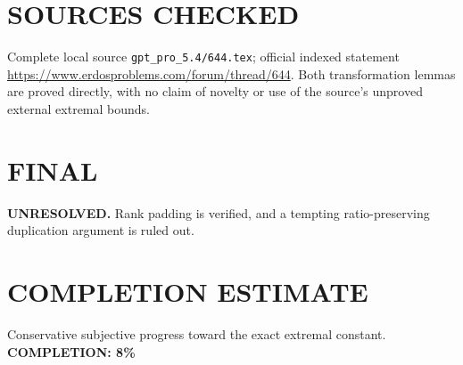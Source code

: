 \section{SOURCES CHECKED}
Complete local source \texttt{gpt\_pro\_5.4/644.tex}; official indexed statement \url{https://www.erdosproblems.com/forum/thread/644}. Both transformation lemmas are proved directly, with no claim of novelty or use of the source's unproved external extremal bounds.
\section{FINAL}
\textbf{UNRESOLVED.} Rank padding is verified, and a tempting ratio-preserving duplication argument is ruled out.
\section{COMPLETION ESTIMATE}
Conservative subjective progress toward the exact extremal constant.
\textbf{COMPLETION: 8\%}
